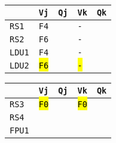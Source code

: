 \begin{enumerate}
    \begin{minipage}{0.45\textwidth}
        \centering
        \begin{tabular}{@{} l | l l l l @{}}
            \toprule
                & \texttt{Vj} & \texttt{Qj} & \texttt{Vk} & \texttt{Qk} \\
            \midrule
            \texttt{RS1} & \texttt{F4} & & \texttt{-} & \\ [.3em]
            \texttt{RS2} & \texttt{F6} & & \texttt{-} & \\
            \cmidrule{1-5}
            \texttt{LDU1} & \texttt{F4} & & \texttt{-} & \\ [.3em]
            \texttt{LDU2} & \hl{\texttt{F6}} & & \hl{\texttt{-}} & \\
            \bottomrule
        \end{tabular}
    \end{minipage}
    \hfill
    \begin{minipage}{0.45\textwidth}
        \centering
        \begin{tabular}{@{} l | l l l l @{}}
            \toprule
            & \texttt{Vj} & \texttt{Qj} & \texttt{Vk} & \texttt{Qk} \\
            \midrule
            \texttt{RS3} & \hl{\texttt{F0}} & & \hl{\texttt{F0}} & \\ [.3em]
            \texttt{RS4} & & & & \\
            \cmidrule{1-5}
            \texttt{FPU1} & & & & \\
            \bottomrule
        \end{tabular}
    \end{minipage}


\end{enumerate}
